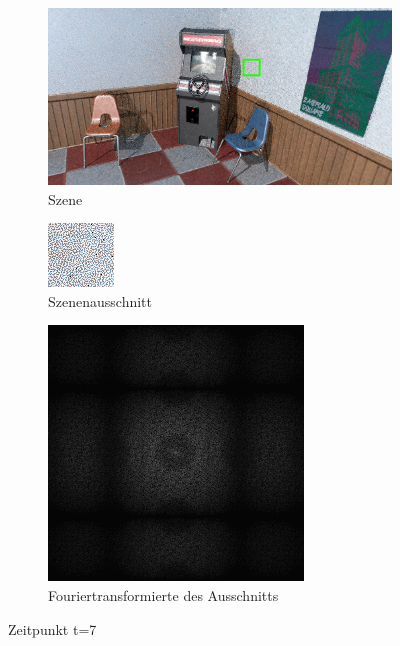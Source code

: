\begin{figure}[H]
    \begin{subfigure}{\textwidth}   
        \centering \includegraphics[scale=.25]{content/TemporalerAlg/Bilder/Sorting/Szene/Szene7.png}
        \caption{Szene}
        \label{fig:Nur_Sorting_Szene_t7}
    \end{subfigure}
    \begin{subfigure}{0.5\textwidth}
        \centering\includegraphics[width=0.4\linewidth]{content/TemporalerAlg/Bilder/Sorting/Ausschnitte/Ausschnitt7.png} 
        \caption{Szenenausschnitt}
        \label{fig:Nur_Sorting_ausschnitt_t7}
    \end{subfigure}
    \begin{subfigure}{0.5\textwidth}
        \centering\includegraphics[width=0.4\linewidth]{content/TemporalerAlg/Bilder/Sorting/Spektren/Ausschnitt7.png}
        \caption{Fouriertransformierte des Ausschnitts}
        \label{fig:Nur_Sorting_Fouriertransformierte_t7}
    \end{subfigure}
        \caption{Zeitpunkt t=7}
        \label{fig:Nur_Sorting_Verlauf_t7}
\end{figure}

